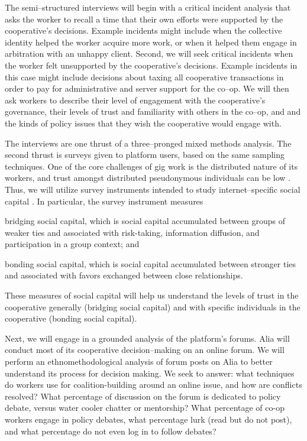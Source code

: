 \documentclass[11pt]{article}
\begin{document}
The semi--structured interviews will begin with
a critical incident analysis that asks the worker to recall
a time that their own efforts were supported by the cooperative's decisions.
Example incidents might include when the collective identity helped the worker acquire more work,
or when it helped them engage in arbitration with an unhappy client.
Second, we will seek critical incidents when the worker felt unsupported by the cooperative's decisions.
Example incidents in this case might include
decisions about taxing all cooperative transactions
in order to pay for administrative and server support for the co--op.
We will then ask workers to describe their level of engagement with
the cooperative's governance,
their levels of trust and familiarity with others in the co--op,
and and the kinds of policy issues that they wish the cooperative would engage with.

The interviews are one thrust of a three--pronged mixed methods analysis.
The second thrust is surveys given to platform users, based on the same sampling techniques.
One of the core challenges of gig work is the distributed nature of its workers,
and trust amongst distributed pseudonymous individuals can be low
\citep{rains2007impact}.
Thus, we will utilize survey instruments intended to study internet--specific social capital
\citep{ellison2007benefits}.
In particular, the survey instrument measures
\begin{inlinelist}
  \item bridging social capital,
  which is social capital accumulated between groups of weaker ties and associated with
    risk-taking,
    information diffusion, and
    participation in a group context; and
  \item bonding social capital,
  which is social capital accumulated between stronger ties and
  associated with favors exchanged between close relationships.
\end{inlinelist}
These measures of social capital will help us understand
the levels of trust in the cooperative generally
(bridging social capital) and
with specific individuals in the cooperative
(bonding social capital).

Next, we will engage in a grounded analysis of the platform's forums.
Alia will conduct most of its cooperative decision--making on an online forum.
We will perform an ethnomethodological analysis of forum posts
on Alia to better understand its process for decision making.
We seek to answer:
what techniques do workers use for coalition-building around an online issue,
and how are conflicts resolved?
What percentage of discussion on the forum is dedicated to policy debate,
versus water cooler chatter or mentorship?
What percentage of co-op workers engage in policy debates,
what percentage lurk (read but do not post), and
what percentage do not even log in to follow debates?
\end{document}
